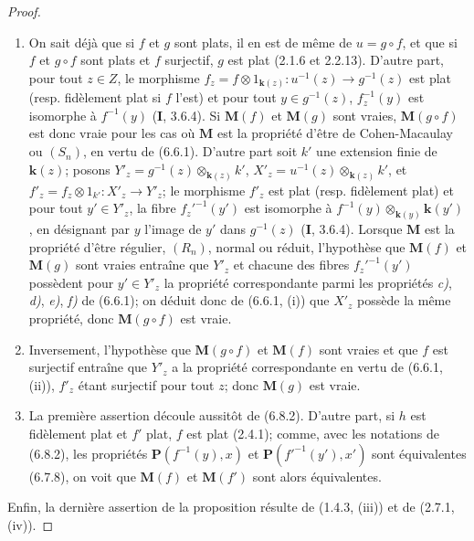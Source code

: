 \begin{proof}
\begin{enumerate}
\item[(i)] On sait déjà que si $f$ et $g$ sont plats, il en est de même de
$u=g\circ f$, et que si $f$ et $g\circ f$ sont plats et $f$ surjectif, $g$ est
plat (2.1.6 et 2.2.13). D'autre part, pour tout $z\in Z$, le morphisme
$f_z=f\otimes1_{\mathbf{k}(z)}:u^{-1}(z)\to g^{-1}(z)$ est plat (resp.
fidèlement plat si $f$ l'est) et pour tout $y\in g^{-1}(z)$,
$f_z^{-1}(y)$ est isomorphe à $f^{-1}(y)$ (\textbf{I}, 3.6.4). Si $\boldsymbol{M}(f)$ et $\boldsymbol{M}(g)$
sont vraies, $\boldsymbol{M}(g\circ f)$ est donc vraie pour les cas où $\boldsymbol{M}$ est la propriété
d'être de Cohen-Macaulay ou $(S_n)$, en vertu de (6.6.1). D'autre part soit
$k'$ une extension finie de $\boldsymbol{k}(z)$; posons
$Y'_z=g^{-1}(z)\otimes_{\mathbf{k}(z)}k'$, $X'_z=u^{-1}(z)\otimes_{\mathbf{k}(z)}k'$, et
$f'_z=f_z\otimes1_{k'}:X'_z\to Y'_z$; le morphisme $f'_z$
est plat
(resp. fidèlement plat) et pour tout $y'\in Y'_z$, la fibre $f_z'^{-1}(y')$
est isomorphe à $f^{-1}(y)\otimes_{\mathbf{k}(y)}\boldsymbol{k}(y')$, en désignant par $y$ l'image
de $y'$ dans $g^{-1}(z)$ (\textbf{I}, 3.6.4). Lorsque $\boldsymbol{M}$ est la propriété d'être
régulier, $(R_n)$, normal ou réduit, l'hypothèse que $\boldsymbol{M}(f)$ et $\boldsymbol{M}(g)$ sont
vraies entraîne que $Y'_z$ et chacune des fibres $f_z'^{-1}(y')$ possèdent
pour $y'\in Y'_z$ la propriété correspondante parmi les propriétés \emph{c)}, \emph{d)},
\emph{e)}, \emph{f)} de (6.6.1); on déduit donc de (6.6.1, (i)) que $X'_z$ possède la même
propriété, donc $\boldsymbol{M}(g\circ f)$ est vraie.
\item[(ii)] Inversement, l'hypothèse que $\boldsymbol{M}(g\circ f)$ et $\boldsymbol{M}(f)$ sont vraies
et que $f$ est surjectif entraîne que $Y'_z$ a la propriété correspondante en
vertu de (6.6.1, (ii)), $f'_z$ étant surjectif pour tout $z$; donc $\boldsymbol{M}(g)$ est
vraie.
\item[(iii)] La première assertion découle aussitôt de (6.8.2). D'autre part,
si $h$ est fidèlement plat et $f'$ plat, $f$ est plat (2.4.1); comme, avec les
notations de (6.8.2), les propriétés $\boldsymbol{P}(f^{-1}(y),x)$ et
$\boldsymbol{P}(f'^{-1}(y'),x')$ sont équivalentes (6.7.8), on voit que $\boldsymbol{M}(f)$ et $\boldsymbol{M}(f')$
sont alors équivalentes.
\end{enumerate}

Enfin, la dernière assertion de la proposition résulte de (1.4.3, (iii)) et
de (2.7.1, (iv)).
\end{proof}

